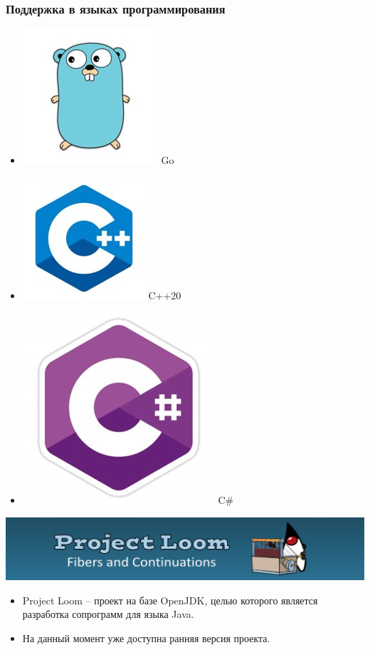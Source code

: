 \begin{frame}
	\frametitle{Поддержка в языках программирования}
	\begin{itemize}
	\item[] \includegraphics[scale=0.7]{images/go.jpg} Go
	\item[] \includegraphics[scale=0.7]{images/cpp.jpg} C++20
	\item[] \includegraphics[scale=0.46]{images/csharp.jpg} C\#
	\end{itemize}
\end{frame}

\begin{frame}
	\includegraphics[scale=0.7]{images/loom.jpg}
	
	\begin{itemize}
	\item	Project Loom – проект на базе OpenJDK, целью которого является разработка сопрограмм для языка Java. 
	\item	На данный момент уже доступна ранняя версия проекта.
	\end{itemize}
\end{frame}

